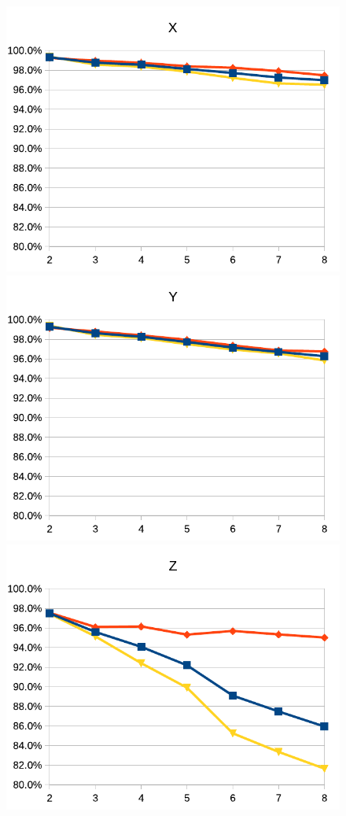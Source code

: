 \documentclass{InsightArticle}
\begin{document}
\begin{figure}[htb]
\center
\includegraphics[scale=0.7]{c10l-x.pdf}
\includegraphics[scale=0.7]{c10l-y.pdf}
\includegraphics[scale=0.7]{c10l-z.pdf}

\end{figure}
\end{document}

